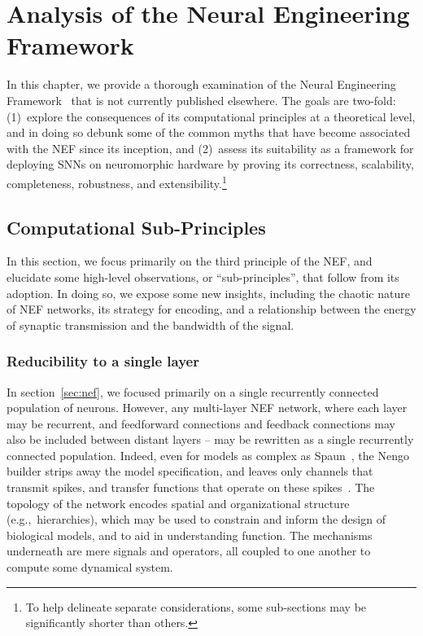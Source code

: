 \chapter{Analysis of the Neural Engineering Framework}
\label{chapt:analysis}

In this chapter, we provide a thorough examination of the Neural Engineering Framework~\citep[NEF;][]{eliasmith2003a} that is not currently published elsewhere.
The goals are two-fold: (1)~explore the consequences of its computational principles at a theoretical level, and in doing so debunk some of the common myths that have become associated with the NEF since its inception, and (2)~assess its suitability as a framework for deploying SNNs on neuromorphic hardware by proving its correctness, scalability, completeness, robustness, and extensibility.\footnote{%
To help delineate separate considerations, some sub-sections may be significantly shorter than others.
}

\section{Computational Sub-Principles}

In this section, we focus primarily on the third principle of the NEF, and elucidate some high-level observations, or ``sub-principles'', that follow from its adoption.
In doing so, we expose some new insights, including the chaotic nature of NEF networks, its strategy for encoding, and a relationship between the energy of synaptic transmission and the bandwidth of the signal.

\subsection{Reducibility to a single layer}

In section~\ref{sec:nef}, we focused primarily on a single recurrently connected population of neurons.
However, any multi-layer NEF network, where each layer may be recurrent, and feedforward connections and feedback connections may also be included between distant layers -- may be rewritten as a single recurrently connected population.
Indeed, even for models as complex as Spaun~\citep{eliasmith2012, choo2018}, the Nengo builder strips away the model specification, and leaves only channels that transmit spikes, and transfer functions that operate on these spikes~\citep{bekolay2014, gosmann2017automatic}.
The topology of the network encodes spatial and organizational structure (e.g.,~hierarchies), which may be used to constrain and inform the design of biological models, and to aid in understanding function.
The mechanisms underneath are mere signals and operators, all coupled to one another to compute some dynamical system.

